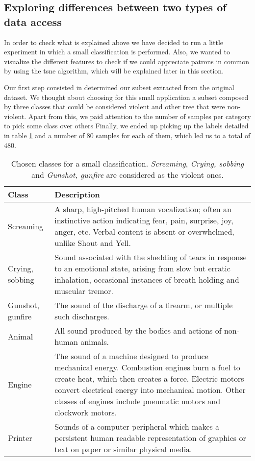 	
\subsection{Exploring differences between two types of data access}

	In order to check what is explained above we have decided to run a little experiment in which a small classification is performed. Also, we wanted to visualize the different features to check if we could appreciate patrons in common by using the \acrfull{tsne} algorithm, which will be explained later in this section.
	
	Our first step consisted in determined our subset extracted from the original dataset. We thought about choosing for this small application a subset composed by three classes that could be considered violent and other tree that were non-violent. Apart from this, we paid attention to the number of samples per category to pick some class over others Finally, we ended up picking up the labels detailed in table \ref{table:4} and a number of 80 samples for each of them, which led us to a total of 480.
	
	\begin{table}[h]
	\begin{center}
		\begin{tabular}{||m{7em} | m{23em} ||}
			\hline
			\textbf{Class} & \textbf{Description} \\
			\hline\hline
			Screaming & A sharp, high-pitched human vocalization; often an instinctive action indicating fear, pain, surprise, joy, anger, etc. Verbal content is absent or overwhelmed, unlike Shout and Yell. \\
			\hline
			Crying, sobbing & Sound associated with the shedding of tears in response to an emotional state, arising from slow but erratic inhalation, occasional instances of breath holding and muscular tremor. \\
			\hline
			Gunshot, gunfire & The sound of the discharge of a firearm, or multiple such discharges. \\
			\hline
			Animal & All sound produced by the bodies and actions of non-human animals. \\
			\hline
			Engine & The sound of a machine designed to produce mechanical energy. Combustion engines burn a fuel to create heat, which then creates a force. Electric motors convert electrical energy into mechanical motion. Other classes of engines include pneumatic motors and clockwork motors. \\
			\hline
			Printer & Sounds of a computer peripheral which makes a persistent human readable representation of graphics or text on paper or similar physical media. \\
			\hline
		\end{tabular}
	\end{center}
	\caption{Chosen classes for a small classification. \textit{Screaming}, \textit{Crying, sobbing} and \textit{Gunshot, gunfire} are considered as the violent ones.}
	\label{table:4}
	\end{table}
	
